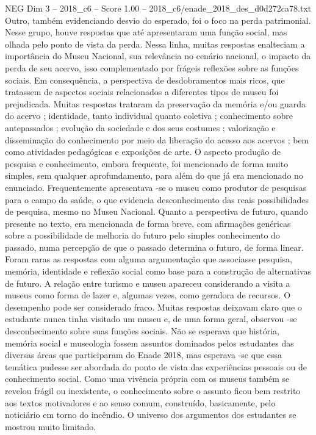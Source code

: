\begin{textsample}{NEG Dim 3 – 2018\_c6 – Score 1.00 – 2018\_c6/enade\_2018\_des\_d0d272ca78.txt}
Outro, também evidenciando desvio do esperado, foi o foco na perda patrimonial.
Nesse grupo, houve respostas que até apresentaram uma função social, mas olhada pelo ponto de vista da perda.
Nessa linha, muitas respostas enalteciam a importância do Museu Nacional, sua relevância no cenário nacional, o impacto da perda de seu acervo, isso complementado por frágeis reflexões sobre as funções sociais.
Em consequência, a perspectiva de desdobramentos mais ricos, que tratassem de aspectos sociais relacionados a diferentes tipos de museu foi prejudicada.
Muitas respostas trataram da preservação da memória e/ou guarda do acervo ; identidade, tanto individual quanto coletiva ; conhecimento sobre antepassados ; evolução da sociedade e dos seus costumes ; valorização e disseminação do conhecimento por meio da liberação do acesso aos acervos ; bem como atividades pedagógicas e exposições de arte.
O aspecto produção de pesquisa e conhecimento, embora frequente, foi mencionado de forma muito simples, sem qualquer aprofundamento, para além do que já era mencionado no enunciado.
Frequentemente apresentava -se o museu como produtor de pesquisas para o campo da saúde, o que evidencia desconhecimento das reais possibilidades de pesquisa, mesmo no Museu Nacional.
Quanto a perspectiva de futuro, quando presente no texto, era mencionada de forma breve, com afirmações genéricas sobre a possibilidade de melhoria do futuro pelo simples conhecimento do passado, numa percepção de que o passado determina o futuro, de forma linear.
Foram raras as respostas com alguma argumentação que associasse pesquisa, memória, identidade e reflexão social como base para a construção de alternativas de futuro.
A relação entre turismo e museu apareceu considerando a visita a museus como forma de lazer e, algumas vezes, como geradora de recursos.
O desempenho pode ser considerado fraco.
Muitas respostas deixavam claro que o estudante nunca tinha visitado um museu e, de uma forma geral, observou -se desconhecimento sobre suas funções sociais.
Não se esperava que história, memória social e museologia fossem assuntos dominados pelos estudantes das diversas áreas que participaram do Enade 2018, mas esperava -se que essa temática pudesse ser abordada do ponto de vista das experiências pessoais ou de conhecimento social.
Como uma vivência própria com os museus também se revelou frágil ou inexistente, o conhecimento sobre o assunto ficou bem restrito aos textos motivadores e ao senso comum, construído, basicamente, pelo noticiário em torno do incêndio.
O universo dos argumentos dos estudantes se mostrou muito limitado.

\end{textsample}
